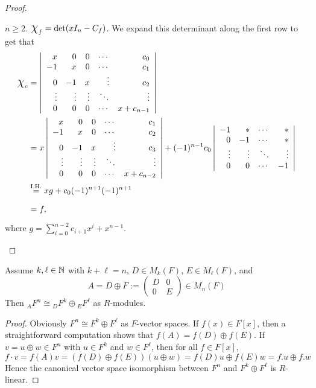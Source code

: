 \documentclass[11pt]{book}
\theoremstyle{definition}   \newtheorem{defn}[counter]{Definition} %
\newcommand{\mymatrix}[2]{\left( \begin{array}{#1} #2 \end{array} \right)}
\newcommand{\mydet}[2]{\left| \begin{array}{#1} #2 \end{array} \right|} \newcommand{\myvec}[1]{\left( \begin{array}{c} #1 \end{array} \right)}
\newcommand{\Chi}{\mbox{\Large $\chi$}}
\newcommand{\vs}{\vspace{8pt}}   \newcommand{\hs}{\hspace{8pt}}
\numberwithin{counter}{chapter}
\begin{document}
\begin{proof}
\begin{enumerate}
$n \geq 2$. $\Chi_f = \det (xI_n - C_f)$. We expand this determinant along the first row to get that
\begin{align*}
\Chi_c &= \mydet{rrrrr}{x & 0 & 0 & \cdots & c_0 \\
                       -1 & x & 0 & \cdots & c_1 \\
                       0 & -1 & x & \vdots  & c_2\\
                       \vdots & \vdots & \vdots & \ddots & \vdots \\
                       0 & 0 & 0 & \cdots & x + c_{n-1}} \\
                       &= x \mydet{rrrrr}{x & 0 & 0 & \cdots & c_1 \\
                                              -1 & x & 0 & \cdots & c_2 \\
                                              0 & -1 & x & \vdots  & c_3\\
                                              \vdots & \vdots & \vdots & \ddots & \vdots \\
                                              0 & 0 & 0 & \cdots & x + c_{n-2}} + (-1)^{n-1} c_0 \mydet{rrrr}{-1 & \ast & \cdots & \ast \\
                                                           0 & -1 & \cdots & \ast \\
                                                           \vdots & \vdots & \ddots & \vdots \\
                                                           0 & 0 & \cdots & -1} \\
        &\overset{\tn{I.H.}}{=} x g + c_0 (-1)^{n+1} (-1)^{n+1} \\
        &= f,
\end{align*}
where $g = \sum_{i=0}^{n-2} c_{i+1} x^i + x^{n-1}$.
\end{enumerate}
\end{proof}

\vs

\begin{lemma}
Assume $k,\ell \in \operatorname{\mathbb{N}}$ with $k + \ell = n$, $D \in M_k(F)$, $E \in M_\ell(F)$, and
	\[A = D \oplus F := \mymatrix{cc}{D & 0 \\ 0 & E} \in M_n(F) \]
Then ${_AF^n} \cong {_DF^k} \oplus {_EF^\ell}$ as $R$-modules.
\end{lemma}

\begin{proof}
Obviously $F^n \cong F^k \oplus F^\ell$ as $F$-vector spaces. If $f(x) \in F[x]$, then a straightforward computation shows that $f(A) = f(D) \oplus f(E)$. If $v = u \oplus w \in F^n$ with $u \in F^k$ and $w \in F^\ell$, then for all $f \in F[x]$,
	\[f \cdot v = f(A) v = (f(D) \oplus f(E)) (u \oplus w) = f(D)u \oplus f(E)w = f.u \oplus f.w \]
Hence the canonical vector space isomorphism between $F^n$ and $F^k \oplus F^\ell$ is $R$-linear.
\end{proof}
\end{document}
